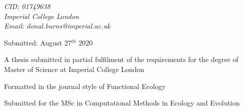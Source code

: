 \begin{titlepage}
	\vspace{0.5\baselineskip} %
	
	\textit{CID: 01749638 \\ Imperial College London \\ Email: donal.burns@imperial.ac.uk} %
	
	\vspace*{2\baselineskip} %
	
	
	
%	
%	
%	
%	
%	
%	
	

	
	
	
	\vspace{0.3\baselineskip} %
	
	Submitted: August 27$^{th}$ 2020 %
	
	

	\vspace{3cm}
	
	A thesis submitted in partial fulfilment of the requirements for the degree of
	Master of Science at Imperial College London
	\vspace{0.5\baselineskip}
	
	Formatted in the journal style of Functional Ecology	
	\vspace{0.5\baselineskip}
	
	Submitted for the MSc in Computational Methods in Ecology and Evolution
	
\end{titlepage}
